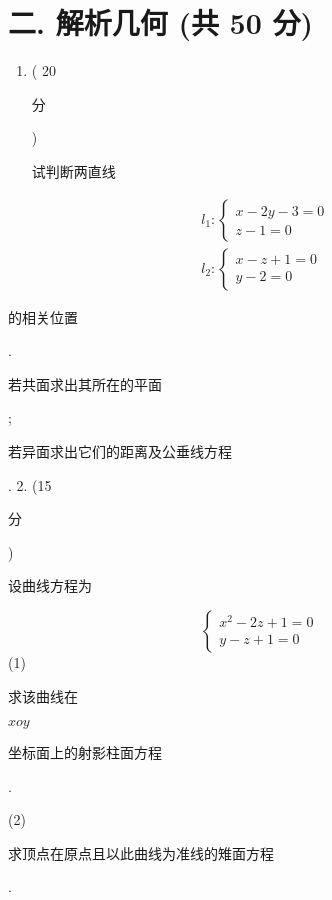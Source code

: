 \documentclass[10pt]{article}
\begin{document}
\section{二. 解析几何 (共 50 分)}
\begin{enumerate}
  \item ( 20 \begin{CJK}{UTF8}{mj}分\end{CJK}) \begin{CJK}{UTF8}{mj}试判断两直线\end{CJK}
\end{enumerate}
$$
\begin{aligned}
&l_{1}:\left\{\begin{array}{l}
x-2 y-3=0 \\
z-1=0
\end{array}\right. \\
&l_{2}:\left\{\begin{array}{l}
x-z+1=0 \\
y-2=0
\end{array}\right.
\end{aligned}
$$
\begin{CJK}{UTF8}{mj}的相关位置\end{CJK}. \begin{CJK}{UTF8}{mj}若共面求出其所在的平面\end{CJK}; \begin{CJK}{UTF8}{mj}若异面求出它们的距离及公垂线方程\end{CJK}. 2. (15 \begin{CJK}{UTF8}{mj}分\end{CJK}) \begin{CJK}{UTF8}{mj}设曲线方程为\end{CJK}
$$
\left\{\begin{array}{l}
x^{2}-2 z+1=0 \\
y-z+1=0
\end{array}\right.
$$
(1) \begin{CJK}{UTF8}{mj}求该曲线在\end{CJK} $x o y$ \begin{CJK}{UTF8}{mj}坐标面上的射影柱面方程\end{CJK}.

(2) \begin{CJK}{UTF8}{mj}求顶点在原点且以此曲线为准线的雉面方程\end{CJK}.
\end{document}
